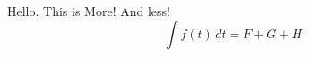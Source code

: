 \documentclass[12pt,reqno]{amsart}
\begin{document}
Hello.
This is More!
And less!
$$\int f(t)\,dt=F+G+H$$
\end{document}
